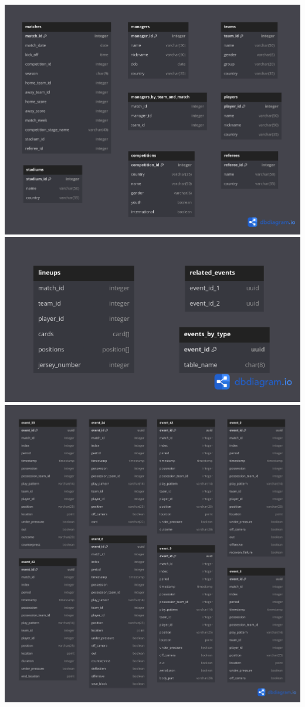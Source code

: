 \documentclass[12pt]{article}
\begin{document}
\includegraphics[width=\textwidth]{reduction/1.png}
\includegraphics[width=\textwidth]{reduction/2.png}
\includegraphics[width=\textwidth]{reduction/3.png}
\end{document}
